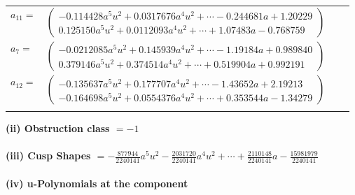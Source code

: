 \documentclass[1p]{elsarticle_modified}
\theoremstyle{definition}
\begin{document}
\begin{tabular}{m{7pt} m{180pt} m{7pt} m{180pt} }
\flushright $a_{11}=$&$\begin{pmatrix}-0.114428 a^{5} u^{2}+0.0317676 a^{4} u^{2}+\cdots-0.244681 a+1.20229\\0.125150 a^{5} u^{2}+0.0112093 a^{4} u^{2}+\cdots+1.07483 a-0.768759\end{pmatrix}$ \\
\flushright $a_{7}=$&$\begin{pmatrix}-0.0212085 a^{5} u^{2}+0.145939 a^{4} u^{2}+\cdots-1.19184 a+0.989840\\0.379146 a^{5} u^{2}+0.374514 a^{4} u^{2}+\cdots+0.519904 a+0.992191\end{pmatrix}$ \\
\flushright $a_{12}=$&$\begin{pmatrix}-0.135637 a^{5} u^{2}+0.177707 a^{4} u^{2}+\cdots-1.43652 a+2.19213\\-0.164698 a^{5} u^{2}+0.0554376 a^{4} u^{2}+\cdots+0.353544 a-1.34279\end{pmatrix}$\\&\end{tabular}
\flushleft \textbf{(ii) Obstruction class $= -1$}\\~\\
\flushleft \textbf{(iii) Cusp Shapes $= -\frac{877944}{2240141} a^5 u^2-\frac{2031720}{2240141} a^4 u^2+\cdots+\frac{2110148}{2240141} a-\frac{15981979}{2240141}$}\\~\\
\newpage\renewcommand{\arraystretch}{1}
\flushleft \textbf{(iv) u-Polynomials at the component}\newline \\
\end{document}
